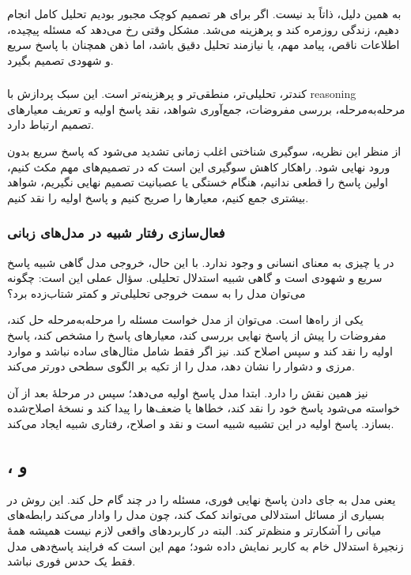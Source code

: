 به همین دلیل،  ذاتاً بد نیست. اگر برای هر تصمیم کوچک مجبور بودیم تحلیل کامل انجام دهیم، زندگی روزمره کند و پرهزینه می‌شد. مشکل وقتی رخ می‌دهد که مسئله پیچیده، اطلاعات ناقص، پیامد مهم، یا نیازمند تحلیل دقیق باشد، اما ذهن همچنان با پاسخ سریع و شهودی تصمیم بگیرد.

\subsubsection{}
 کندتر، تحلیلی‌تر، منطقی‌تر و پرهزینه‌تر است. این سبک پردازش با reasoning مرحله‌به‌مرحله، بررسی مفروضات، جمع‌آوری شواهد، نقد پاسخ اولیه و تعریف معیارهای تصمیم ارتباط دارد.

از منظر این نظریه، سوگیری شناختی اغلب زمانی تشدید می‌شود که پاسخ سریع  بدون ورود  نهایی شود. راهکار کاهش سوگیری این است که در تصمیم‌های مهم مکث کنیم، اولین پاسخ را قطعی ندانیم، هنگام خستگی یا عصبانیت تصمیم نهایی نگیریم، شواهد بیشتری جمع کنیم، معیارها را صریح کنیم و پاسخ اولیه را نقد کنیم.

\subsubsection{فعال‌سازی رفتار شبیه  در مدل‌های زبانی}
در  یا  چیزی به معنای انسانی  و  وجود ندارد. با این حال، خروجی مدل گاهی شبیه پاسخ سریع و شهودی است و گاهی شبیه استدلال تحلیلی. سؤال عملی این است: چگونه می‌توان مدل را به سمت خروجی تحلیلی‌تر و کمتر شتاب‌زده برد؟

یکی از راه‌ها  است. می‌توان از مدل خواست مسئله را مرحله‌به‌مرحله حل کند، مفروضات را پیش از پاسخ نهایی بررسی کند، معیارهای پاسخ را مشخص کند، پاسخ اولیه را نقد کند و سپس اصلاح کند.  نیز اگر فقط شامل مثال‌های ساده نباشد و موارد مرزی و دشوار را نشان دهد، مدل را از تکیه بر الگوی سطحی دورتر می‌کند.

 نیز همین نقش را دارد. ابتدا مدل پاسخ اولیه می‌دهد؛ سپس در مرحلهٔ بعد از آن خواسته می‌شود پاسخ خود را نقد کند، خطاها یا ضعف‌ها را پیدا کند و نسخهٔ اصلاح‌شده بسازد. پاسخ اولیه در این تشبیه شبیه  است و نقد و اصلاح، رفتاری شبیه  ایجاد می‌کند.

\subsection{،  و }
 یعنی مدل به جای دادن پاسخ نهایی فوری، مسئله را در چند گام حل کند. این روش در بسیاری از مسائل استدلالی می‌تواند کمک کند، چون مدل را وادار می‌کند رابطه‌های میانی را آشکارتر و منظم‌تر کند. البته در کاربردهای واقعی لازم نیست همیشه همهٔ زنجیرهٔ استدلال خام به کاربر نمایش داده شود؛ مهم این است که فرایند پاسخ‌دهی مدل فقط یک حدس فوری نباشد.

